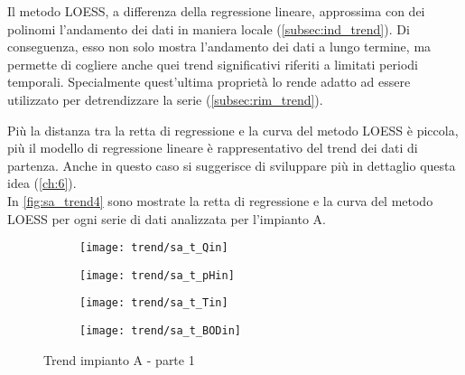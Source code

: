 Il metodo LOESS, a differenza della regressione lineare, approssima con dei polinomi l'andamento dei dati in maniera locale (\autoref{subsec:ind_trend}). Di conseguenza, esso non solo mostra l'andamento dei dati a lungo termine, ma permette di cogliere anche quei trend significativi riferiti a limitati periodi temporali. Specialmente quest'ultima proprietà lo rende adatto ad essere utilizzato per detrendizzare la serie (\autoref{subsec:rim_trend}).

Più la distanza tra la retta di regressione e la curva del metodo LOESS è piccola, più  il modello di regressione lineare è rappresentativo del trend dei dati di partenza. Anche in questo caso si suggerisce di sviluppare più in dettaglio questa idea (\autoref{ch:6}).\\


In \autoref{fig:sa_trend4} sono mostrate la retta di regressione e la curva del metodo LOESS per ogni serie di dati analizzata per l'impianto A.


\begin{sidewaysfigure}[h]
	\renewcommand*\thesubfigure{(\arabic{subfigure})}
	\begin{subfigure}{0.49\textwidth}
		\texttt{[image: trend/sa\_t\_Qin]}
		\caption{}
		\label{fig:sa_t_Qin}
		\centering
	\end{subfigure}
	\begin{subfigure}{0.49\textwidth}
		\texttt{[image: trend/sa\_t\_pHin]}
		\caption{}
		\label{fig:sa_t_pHin}
		\centering
	\end{subfigure}

	\begin{subfigure}{0.49\textwidth}
		\texttt{[image: trend/sa\_t\_Tin]}
		\caption{}
		\label{fig:sa_t_Tin}
		\centering
	\end{subfigure}
	\begin{subfigure}{0.49\textwidth}
		\texttt{[image: trend/sa\_t\_BODin]}
		\caption{}
		\centering
	\end{subfigure}
\caption{Trend impianto A - parte 1}
\label{fig:sa_trend4}
\end{sidewaysfigure}

